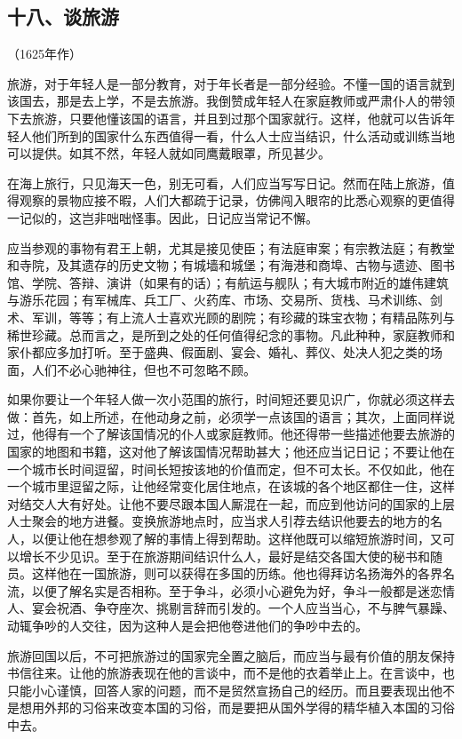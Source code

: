 \subsection*{十八、谈旅游}
\begin{center}
    （1625年作）
\end{center}
\par 旅游，对于年轻人是一部分教育，对于年长者是一部分经验。不懂一国的语言就到该国去，那是去上学，不是去旅游。我倒赞成年轻人在家庭教师或严肃仆人的带领下去旅游，只要他懂该国的语言，并且到过那个国家就行。这样，他就可以告诉年轻人他们所到的国家什么东西值得一看，什么人士应当结识，什么活动或训练当地可以提供。如其不然，年轻人就如同鹰戴眼罩，所见甚少。
\par 在海上旅行，只见海天一色，别无可看，人们应当写写日记。然而在陆上旅游，值得观察的景物应接不暇，人们大都疏于记录，仿佛闯入眼帘的比悉心观察的更值得一记似的，这岂非咄咄怪事。因此，日记应当常记不懈。
\par 应当参观的事物有君王上朝，尤其是接见使臣；有法庭审案；有宗教法庭；有教堂和寺院，及其遗存的历史文物；有城墙和城堡；有海港和商埠、古物与遗迹、图书馆、学院、答辩、演讲（如果有的话）；有航运与舰队；有大城市附近的雄伟建筑与游乐花园；有军械库、兵工厂、火药库、市场、交易所、货栈、马术训练、剑术、军训，等等；有上流人士喜欢光顾的剧院；有珍藏的珠宝衣物；有精品陈列与稀世珍藏。总而言之，是所到之处的任何值得纪念的事物。凡此种种，家庭教师和家仆都应多加打听。至于盛典、假面剧、宴会、婚礼、葬仪、处决人犯之类的场面，人们不必心驰神往，但也不可忽略不顾。
\par 如果你要让一个年轻人做一次小范围的旅行，时间短还要见识广，你就必须这样去做：首先，如上所述，在他动身之前，必须学一点该国的语言；其次，上面同样说过，他得有一个了解该国情况的仆人或家庭教师。他还得带一些描述他要去旅游的国家的地图和书籍，这对他了解该国情况帮助甚大；他还应当记日记；不要让他在一个城市长时间逗留，时间长短按该地的价值而定，但不可太长。不仅如此，他在一个城市里逗留之际，让他经常变化居住地点，在该城的各个地区都住一住，这样对结交人大有好处。让他不要尽跟本国人厮混在一起，而应到他访问的国家的上层人士聚会的地方进餐。变换旅游地点时，应当求人引荐去结识他要去的地方的名人，以便让他在想参观了解的事情上得到帮助。这样他既可以缩短旅游时间，又可以增长不少见识。至于在旅游期间结识什么人，最好是结交各国大使的秘书和随员。这样他在一国旅游，则可以获得在多国的历练。他也得拜访名扬海外的各界名流，以便了解名实是否相称。至于争斗，必须小心避免为好，争斗一般都是迷恋情人、宴会祝酒、争夺座次、挑剔言辞而引发的。一个人应当当心，不与脾气暴躁、动辄争吵的人交往，因为这种人是会把他卷进他们的争吵中去的。
\par 旅游回国以后，不可把旅游过的国家完全置之脑后，而应当与最有价值的朋友保持书信往来。让他的旅游表现在他的言谈中，而不是他的衣着举止上。在言谈中，也只能小心谨慎，回答人家的问题，而不是贸然宣扬自己的经历。而且要表现出他不是想用外邦的习俗来改变本国的习俗，而是要把从国外学得的精华植入本国的习俗中去。




